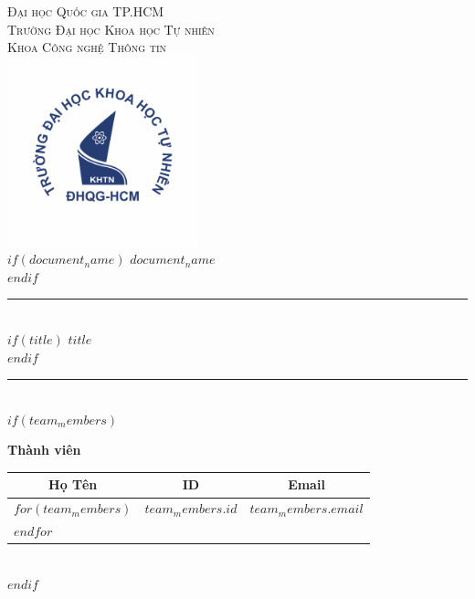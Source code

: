 \documentclass[$if(fontsize)$$fontsize$,$endif$$if(lang)$$babel-lang$,$endif$$if(papersize)$$papersize$paper,$endif$$for(classoption)$$classoption$$sep$,$endfor$]{$documentclass$}
\renewcommand{\arraystretch}{1.4}
\begin{document}
\begin{titlepage}
\begin{center}

{\Large\textsc{Đại học Quốc gia TP.HCM}}\\[0.2cm]
{\Large\textsc{Trường Đại học Khoa học Tự nhiên}}\\[0.2cm]
{\Large\textsc{Khoa Công nghệ Thông tin}}\\[1cm]

\includegraphics[width=5.5cm]{./title/logo.png}\\[0cm]

$if(document_name)$
{\Large\bfseries $document_name$}\\[0.7cm]
$endif$

\rule{\linewidth}{0.5mm}\\[0.6cm]
$if(title)${\huge\bfseries\color{accent} $title$}\\[0.3cm]$endif$
\rule{\linewidth}{0.5mm}\\[0.6cm]

$if(team_members)$
\begin{minipage}{\textwidth}
\begin{center}
\large\textbf{Thành viên}\\[0.3cm]

\setlength{\arrayrulewidth}{0.8pt}
\setlength{\doublerulesep}{2pt}
\renewcommand{\arraystretch}{1.8}
\begin{tabular}{@{}p{4.5cm}@{}p{3cm}@{}p{5cm}@{}}
\toprule
\multicolumn{1}{c}{\textbf{Họ Tên}} & \multicolumn{1}{c}{\textbf{ID}} & \multicolumn{1}{c}{\textbf{Email}} \\
\midrule
$for(team_members)$
\multicolumn{1}{c}{$team_members.name$} & \multicolumn{1}{c}{$team_members.id$} & \multicolumn{1}{c}{$team_members.email$} \\
$endfor$
\bottomrule
\end{tabular}
\end{center}
\end{minipage}\\[0.8cm]
$endif$


\end{center}
\end{titlepage}
\end{document}
